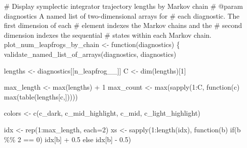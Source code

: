 \documentclass[
  letterpaper,
  DIV=11,
  numbers=noendperiod]{scrartcl}
\newenvironment{Shaded}{\begin{snugshade}}{\end{snugshade}}
\newcommand{\BuiltInTok}[1]{\textcolor[rgb]{0.00,0.23,0.31}{#1}}
\newcommand{\CommentTok}[1]{\textcolor[rgb]{0.37,0.37,0.37}{#1}}
\newcommand{\ControlFlowTok}[1]{\textcolor[rgb]{0.00,0.23,0.31}{#1}}
\newcommand{\DecValTok}[1]{\textcolor[rgb]{0.68,0.00,0.00}{#1}}
\newcommand{\FloatTok}[1]{\textcolor[rgb]{0.68,0.00,0.00}{#1}}
\newcommand{\KeywordTok}[1]{\textcolor[rgb]{0.00,0.23,0.31}{#1}}
\newcommand{\NormalTok}[1]{\textcolor[rgb]{0.00,0.23,0.31}{#1}}
\newcommand{\OperatorTok}[1]{\textcolor[rgb]{0.37,0.37,0.37}{#1}}
\newcommand{\StringTok}[1]{\textcolor[rgb]{0.13,0.47,0.30}{#1}}
\begin{document}
\begin{Shaded}
\end{Shaded}

\begin{Shaded}
\begin{Highlighting}[]
\CommentTok{\# Display symplectic integrator trajectory lengths by Markov chain}
\CommentTok{\# @param diagnostics A named list of two{-}dimensional arrays for }
\CommentTok{\#                    each diagnostic.  The first dimension of each}
\CommentTok{\#                    element indexes the Markov chains and the }
\CommentTok{\#                    second dimension indexes the sequential }
\CommentTok{\#                    states within each Markov chain.}
\NormalTok{plot\_num\_leapfrogs\_by\_chain }\OperatorTok{\textless{}{-}}\NormalTok{ function(diagnostics) \{}
\NormalTok{  validate\_named\_list\_of\_arrays(diagnostics, }\StringTok{\textquotesingle{}diagnostics\textquotesingle{}}\NormalTok{)}
  
\NormalTok{  lengths }\OperatorTok{\textless{}{-}}\NormalTok{ diagnostics[[}\StringTok{\textquotesingle{}n\_leapfrog\_\_\textquotesingle{}}\NormalTok{]]}
\NormalTok{  C }\OperatorTok{\textless{}{-}}\NormalTok{ dim(lengths)[}\DecValTok{1}\NormalTok{]}

\NormalTok{  max\_length }\OperatorTok{\textless{}{-}} \BuiltInTok{max}\NormalTok{(lengths) }\OperatorTok{+} \DecValTok{1}
\NormalTok{  max\_count }\OperatorTok{\textless{}{-}} \BuiltInTok{max}\NormalTok{(sapply(}\DecValTok{1}\NormalTok{:C, function(c) }\BuiltInTok{max}\NormalTok{(table(lengths[c,]))))}

\NormalTok{  colors }\OperatorTok{\textless{}{-}}\NormalTok{ c(c\_dark, c\_mid\_highlight, c\_mid, c\_light\_highlight)}

\NormalTok{  idx }\OperatorTok{\textless{}{-}}\NormalTok{ rep(}\DecValTok{1}\NormalTok{:max\_length, each}\OperatorTok{=}\DecValTok{2}\NormalTok{)}
\NormalTok{  xs }\OperatorTok{\textless{}{-}}\NormalTok{ sapply(}\DecValTok{1}\NormalTok{:length(idx), function(b) }\ControlFlowTok{if}\NormalTok{(b }\OperatorTok{\%\%} \DecValTok{2} \OperatorTok{==} \DecValTok{0}\NormalTok{) idx[b] }\OperatorTok{+} \FloatTok{0.5}
                                          \ControlFlowTok{else}\NormalTok{ idx[b] }\OperatorTok{{-}} \FloatTok{0.5}\NormalTok{)}


\end{Highlighting}
\end{Shaded}
\end{document}
